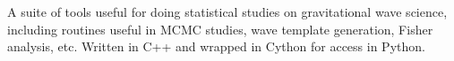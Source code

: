 A suite of tools useful for doing statistical studies on gravitational wave science, including routines useful in M\+C\+MC studies, wave template generation, Fisher analysis, etc. Written in C++ and wrapped in Cython for access in Python. 